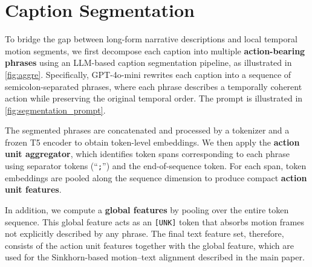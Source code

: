 \section{Caption Segmentation}
To bridge the gap between long-form narrative descriptions and local temporal motion segments, we first decompose each caption into multiple \textbf{action-bearing phrases} using an LLM-based caption segmentation pipeline, as illustrated in \cref{fig:aggre}. 
Specifically, GPT-4o-mini rewrites each caption into a sequence of semicolon-separated phrases, where each phrase describes a temporally coherent action while preserving the original temporal order. The prompt is illustrated in \cref{fig:segmentation_prompt}.

The segmented phrases are concatenated and processed by a tokenizer and a frozen T5 encoder to obtain token-level embeddings. 
We then apply the \textbf{action unit aggregator}, which identifies token spans corresponding to each phrase using separator tokens (``\texttt{;}'') and the end-of-sequence token. 
For each span, token embeddings are pooled along the sequence dimension to produce compact \textbf{action unit features}.

In addition, we compute a \textbf{global features} by pooling over the entire token sequence. 
This global feature acts as an \texttt{[UNK]} token that absorbs motion frames not explicitly described by any phrase. 
The final text feature set, therefore, consists of the action unit features together with the global feature, which are used for the Sinkhorn-based motion–text alignment described in the main paper.

